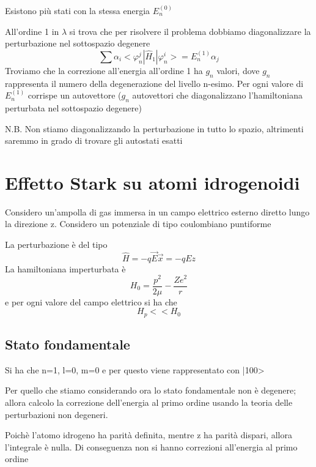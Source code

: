 Esistono più stati con la stessa energia \(E^{(0)}_n\)

\noindent All'ordine 1 in \(\lambda\) si trova che per risolvere il problema dobbiamo diagonalizzare la perturbazione nel sottospazio degenere
\begin{equation*}
    \sum \alpha_i < \varphi^j_n | \hat{H}_1 | \varphi^i_n> = E^{(1)}_n \alpha_j
\end{equation*}
Troviamo che la correzione all'energia all'ordine 1 ha \(g_n\) valori, dove \(g_n\) rappresenta il numero della degenerazione del livello n-esimo. Per ogni valore di \(E^{(1)}_n\) corrispe un autovettore (\(g_n\) autovettori che diagonalizzano l'hamiltoniana perturbata nel sottospazio degenere)

\noindent N.B. \; Non stiamo diagonalizzando la perturbazione in tutto lo spazio, altrimenti saremmo in grado di trovare gli autostati esatti

\section{Effetto Stark su atomi idrogenoidi}

Considero un'ampolla di gas immersa in un campo elettrico esterno diretto lungo la direzione z. Considero un potenziale di tipo coulombiano puntiforme

\noindent La perturbazione è del tipo 
\begin{equation*}
    \hat{H} = -q \vec{E} \vec{x} = -qEz
\end{equation*}
La hamiltoniana imperturbata è 
\begin{equation*}
    H_0 = \frac{p^2}{2\mu} - \frac{Ze^2}{r}
\end{equation*}
e per ogni valore del campo elettrico si ha che
\begin{equation*}
    H_p << H_0
\end{equation*}

\subsection*{Stato fondamentale}

Si ha che n=1, l=0, m=0 e per questo viene rappresentato con |100>

\noindent Per quello che stiamo considerando ora lo stato fondamentale non è degenere; allora calcolo la correzione dell'energia al primo ordine usando la teoria delle perturbazioni non degeneri.

\noindent Poichè l'atomo idrogeno ha parità definita, mentre z ha parità dispari, allora l'integrale è nulla. 
Di conseguenza non si hanno correzioni all'energia al primo ordine

